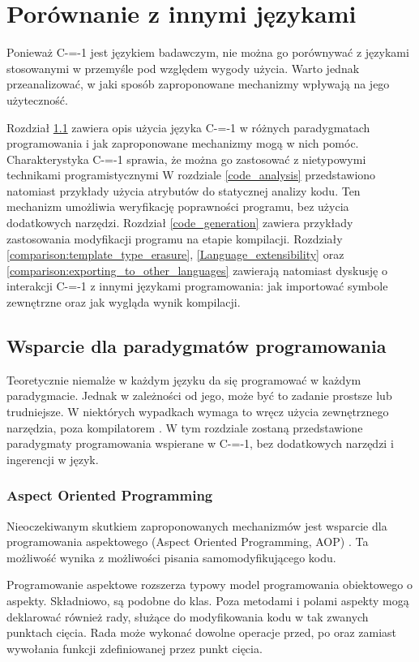 \section{Porównanie z innymi językami}

Ponieważ C-=-1 jest językiem badawczym, nie można go porównywać z językami stosowanymi w przemyśle pod względem wygody użycia.
Warto jednak przeanalizować, w jaki sposób zaproponowane mechanizmy wpływają na jego użyteczność.

Rozdział \ref{programming_paradigms} zawiera opis użycia języka C-=-1 w różnych paradygmatach programowania i jak zaproponowane mechanizmy mogą w nich pomóc.
Charakterystyka C-=-1 sprawia, że można go zastosować z nietypowymi technikami programistycznymi
W rozdziale \ref{code_analysis} przedstawiono natomiast przykłady użycia atrybutów do statycznej analizy kodu.
Ten mechanizm umożliwia weryfikację poprawności programu, bez użycia dodatkowych narzędzi.
Rozdział \ref{code_generation} zawiera przykłady zastosowania modyfikacji programu na etapie kompilacji.
Rozdziały \ref{comparison:template_type_erasure}, \ref{Language_extensibility} oraz \ref{comparison:exporting_to_other_languages} zawierają natomiast dyskusję o interakcji C-=-1 z innymi językami programowania: jak importować symbole zewnętrzne oraz jak wygląda wynik kompilacji.

\subsection{Wsparcie dla paradygmatów programowania}
\label{programming_paradigms}
Teoretycznie niemalże w każdym języku da się programować w każdym paradygmacie. Jednak w zależności od jego, może być to zadanie prostsze lub trudniejsze.
W niektórych wypadkach wymaga to wręcz użycia zewnętrznego narzędzia, poza kompilatorem \cite{aop:cpp}.
W tym rozdziale zostaną przedstawione paradygmaty programowania wspierane w C-=-1, bez dodatkowych narzędzi i ingerencji w język.

\subsubsection{Aspect Oriented Programming}
Nieoczekiwanym skutkiem zaproponowanych mechanizmów jest wsparcie dla programowania aspektowego (Aspect Oriented Programming, AOP) \cite{aop}.
Ta możliwość wynika z możliwości pisania samomodyfikującego kodu.

Programowanie aspektowe rozszerza typowy model programowania obiektowego o aspekty.
Składniowo, są podobne do klas.
Poza metodami i polami aspekty mogą deklarować również rady, służące do modyfikowania kodu w tak zwanych punktach cięcia.
Rada może wykonać dowolne operacje przed, po oraz zamiast wywołania funkcji zdefiniowanej przez punkt cięcia.

